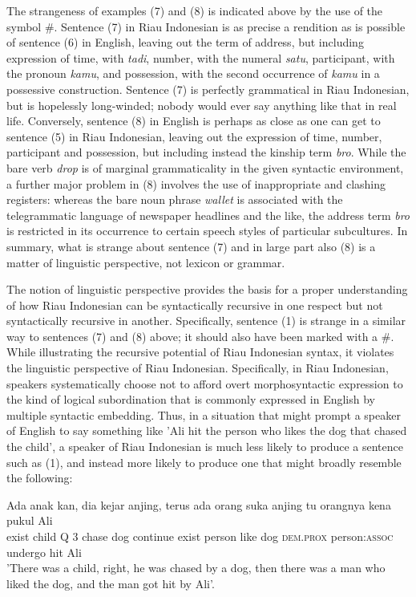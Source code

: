 \documentclass[output=paper,colorlinks,citecolor=brown
]{langscibook}
\begin{document}
The strangeness of examples (7) and (8) is indicated above by the use of the symbol \#.  Sentence (7) in Riau Indonesian is as precise a rendition as is possible of sentence (6) in English, leaving out the term of address, but including expression of time, with \emph{tadi}, number, with the numeral \emph{satu}, participant, with the pronoun \emph{kamu}, and possession, with the second occurrence of \emph{kamu} in a possessive construction.  Sentence (7) is perfectly grammatical in Riau Indonesian, but is hopelessly long-winded; nobody would ever say anything like that in real life.  Conversely, sentence (8) in English is perhaps as close as one can get to sentence (5) in Riau Indonesian, leaving out the expression of time, number, participant and possession, but including instead the kinship term \emph{bro}.  While the bare verb \emph{drop} is of marginal grammaticality in the given syntactic environment, a further major problem in (8) involves the use of inappropriate and clashing registers: whereas the bare noun phrase \emph{wallet} is associated with the telegrammatic language of newspaper headlines and the like, the address term \emph{bro} is restricted in its occurrence to certain speech styles of particular subcultures.  In summary, what is strange about sentence (7) and in large part also (8) is a matter of linguistic perspective, not lexicon or grammar.

The notion of linguistic perspective provides the basis for a proper understanding of how Riau Indonesian can be syntactically recursive in one respect but not syntactically recursive in another.  Specifically, sentence (1) is strange in a similar way to sentences (7) and (8) above; it should also have been marked with a #.  While illustrating the recursive potential of Riau Indonesian syntax, it violates the linguistic perspective of Riau Indonesian.  Specifically, in Riau Indonesian, speakers systematically choose not to afford overt morphosyntactic expression to the kind of logical subordination that is commonly expressed in English by multiple syntactic embedding.  Thus, in a situation that might prompt a speaker of English to say something like 'Ali hit the person who likes the dog that chased the child', a speaker of Riau Indonesian is much less likely to produce a sentence such as (1), and instead more likely to produce one that might broadly resemble the following:

\ea
\gll Ada	anak	kan,	dia	kejar	anjing,	terus	ada	orang	suka	anjing	tu orangnya	kena	pukul	Ali \\
    exist	child	Q	3	chase	dog	continue	exist	person	like	dog \textsc{dem.prox} person:\textsc{assoc}	undergo	hit	Ali\\
\glt 		'There was a child, right, he was chased by a dog, then there was a man who liked the dog, and the man got hit by Ali'.
\z
\end{document}
